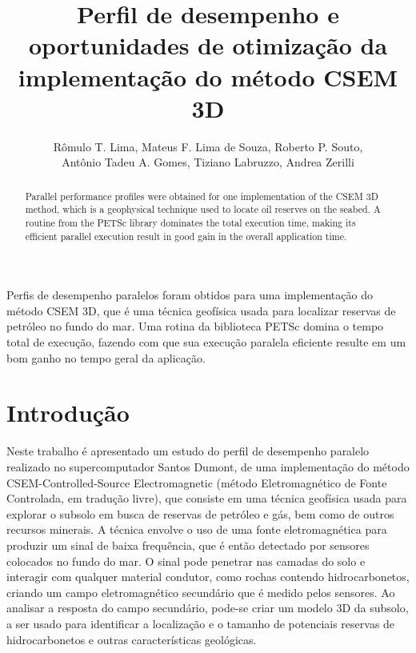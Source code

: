 \documentclass[12pt]{article}
\title{Perfil de desempenho e oportunidades de otimização da implementação do método CSEM 3D}
\author{Rômulo T. Lima\inst{1,2}, Mateus F. Lima de Souza\inst{1,3}, Roberto P. Souto\inst{1}, \\ 
        Antônio Tadeu A. Gomes\inst{1}, Tiziano Labruzzo\inst{1,4}, Andrea Zerilli\inst{1,4}}
\begin{document}
 

\maketitle

\begin{abstract}
Parallel performance profiles were obtained for one implementation of the CSEM 3D method, which is a geophysical technique used to locate oil reserves on the seabed. A routine from the PETSc library dominates the total execution time, making its efficient parallel execution result in good gain in the overall application time.
\end{abstract}
     
\begin{resumo} 
Perfis de desempenho paralelos foram obtidos para uma implementação do método CSEM 3D, que é uma técnica geofísica usada para localizar reservas de petróleo no fundo do mar. Uma rotina da biblioteca PETSc domina o tempo total de execução, fazendo com que sua execução paralela eficiente resulte em um bom ganho no tempo geral da aplicação. 
\end{resumo}


\section{Introdução}
\label{sec:intro}
%
Neste trabalho é apresentado um estudo do perfil de desempenho paralelo realizado no supercomputador Santos Dumont, de uma implementação do método CSEM-Controlled-Source Electromagnetic (método Eletromagnético de Fonte Controlada, em tradução livre)\cite{zerilli2014broadband}, que consiste em uma técnica geofísica usada para explorar o subsolo em busca de reservas de petróleo e gás, bem como de outros recursos minerais. A técnica envolve o uso de uma fonte eletromagnética para produzir um sinal de baixa frequência, que é então detectado por sensores colocados no fundo do mar. O sinal pode penetrar nas camadas do solo e interagir com qualquer material condutor, como rochas contendo hidrocarbonetos, criando um campo eletromagnético secundário que é medido pelos sensores. Ao analisar a resposta do campo secundário, pode-se criar um modelo 3D da subsolo, a ser usado para identificar a localização e o tamanho de potenciais reservas de hidrocarbonetos e outras características geológicas. 
\end{document}
